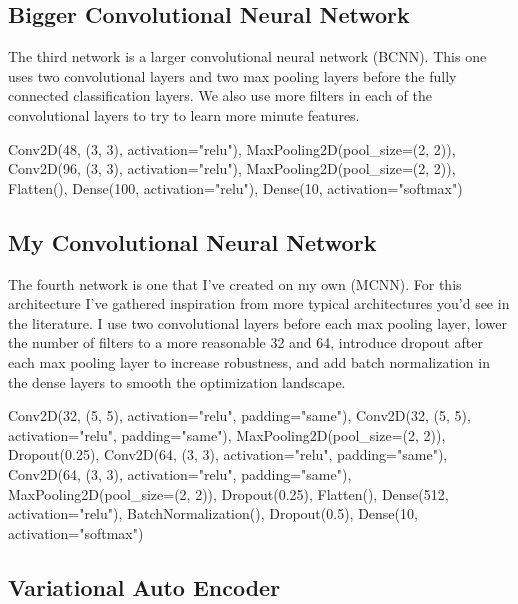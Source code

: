 \documentclass[12pt]{article}
\begin{document}
\subsection{Bigger Convolutional Neural Network}

The third network is a larger convolutional neural network (BCNN).
This one uses two convolutional layers and two max pooling layers before the fully connected classification layers.
We also use more filters in each of the convolutional layers to try to learn more minute features.
\begin{python}
Conv2D(48, (3, 3), activation="relu"),
MaxPooling2D(pool_size=(2, 2)),
Conv2D(96, (3, 3), activation="relu"),
MaxPooling2D(pool_size=(2, 2)),
Flatten(),
Dense(100, activation="relu"),
Dense(10, activation="softmax")
\end{python}


\subsection{My Convolutional Neural Network}

The fourth network is one that I've created on my own (MCNN).
For this architecture I've gathered inspiration from more typical architectures you'd see in the literature.
I use two convolutional layers before each max pooling layer, lower the number of filters to a more
 reasonable 32 and 64, introduce dropout after each max pooling layer to increase robustness, and
 add batch normalization in the dense layers to smooth the optimization landscape.
\begin{python}
Conv2D(32, (5, 5), activation="relu", padding="same"),
Conv2D(32, (5, 5), activation="relu", padding="same"),
MaxPooling2D(pool_size=(2, 2)),
Dropout(0.25),
Conv2D(64, (3, 3), activation="relu", padding="same"),
Conv2D(64, (3, 3), activation="relu", padding="same"),
MaxPooling2D(pool_size=(2, 2)),
Dropout(0.25),
Flatten(),
Dense(512, activation="relu"),
BatchNormalization(),
Dropout(0.5),
Dense(10, activation="softmax")
\end{python}


\subsection{Variational Auto Encoder}
\end{document}

